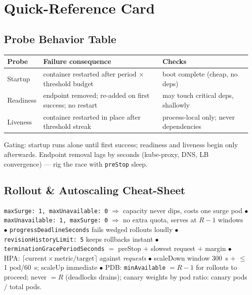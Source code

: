\section{Quick-Reference Card}
\label{sec:ch17-quickref}

\subsection*{Probe Behavior Table}
\begin{table}[h]
  \centering
  \small
  \begin{tabularx}{\textwidth}{l X X}
    \toprule
    \textbf{Probe} & \textbf{Failure consequence} & \textbf{Checks} \\
    \midrule
    Startup & container restarted after period $\times$ threshold budget & boot complete (cheap, no deps) \\
    Readiness & endpoint removed; re-added on first success; no restart & may touch critical deps, shallowly \\
    Liveness & container restarted in place after threshold streak & process-local only; never dependencies \\
    \bottomrule
  \end{tabularx}
\end{table}

Gating: startup runs alone until first success; readiness and liveness
begin only afterwards. Endpoint removal lags by seconds (kube-proxy, DNS,
LB convergence) --- rig the race with \texttt{preStop} sleep.

\subsection*{Rollout \& Autoscaling Cheat-Sheet}
\texttt{maxSurge: 1, maxUnavailable: 0} $\Rightarrow$ capacity never dips,
costs one surge pod $\bullet$ \texttt{maxUnavailable: 1, maxSurge: 0}
$\Rightarrow$ no extra quota, serves at $R{-}1$ windows $\bullet$
\texttt{progressDeadlineSeconds} fails wedged rollouts loudly $\bullet$
\texttt{revisionHistoryLimit: 5} keeps rollbacks instant $\bullet$
\texttt{terminationGracePeriodSeconds} $=$ preStop $+$ slowest request
$+$ margin $\bullet$ HPA: $\lceil \text{current} \times
\text{metric}/\text{target} \rceil$ against \emph{requests} $\bullet$
scaleDown window 300~s $+$ $\le$1 pod/60~s; scaleUp immediate $\bullet$
PDB: \texttt{minAvailable} $= R - 1$ for rollouts to proceed; never
${=}R$ (deadlocks drains); canary weights by pod ratio: canary pods $/$
total pods.

